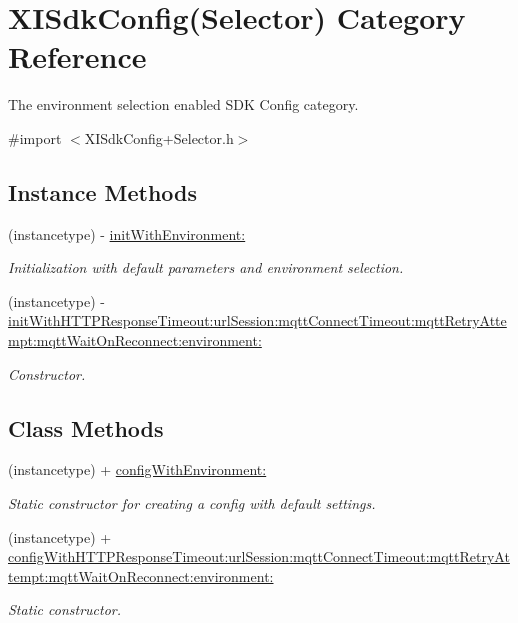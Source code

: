 \hypertarget{category_x_i_sdk_config_07_selector_08}{}\section{X\+I\+Sdk\+Config(Selector) Category Reference}
\label{category_x_i_sdk_config_07_selector_08}


The environment selection enabled S\+DK Config category.  




{\ttfamily \#import $<$X\+I\+Sdk\+Config+\+Selector.\+h$>$}

\subsection*{Instance Methods}
\begin{DoxyCompactItemize}
\item 
(instancetype) -\/ \hyperlink{category_x_i_sdk_config_07_selector_08_aaf78fa6769fee2f17ba641609f112e55}{init\+With\+Environment\+:}
\begin{DoxyCompactList}\small\item\em Initialization with default parameters and environment selection. \end{DoxyCompactList}\item 
(instancetype) -\/ \hyperlink{category_x_i_sdk_config_07_selector_08_aeceeeb80a520f874d9793485a70bd591}{init\+With\+H\+T\+T\+P\+Response\+Timeout\+:url\+Session\+:mqtt\+Connect\+Timeout\+:mqtt\+Retry\+Attempt\+:mqtt\+Wait\+On\+Reconnect\+:environment\+:}
\begin{DoxyCompactList}\small\item\em Constructor. \end{DoxyCompactList}\end{DoxyCompactItemize}
\subsection*{Class Methods}
\begin{DoxyCompactItemize}
\item 
(instancetype) + \hyperlink{category_x_i_sdk_config_07_selector_08_afa1234314350e4363b3540809540812b}{config\+With\+Environment\+:}
\begin{DoxyCompactList}\small\item\em Static constructor for creating a config with default settings. \end{DoxyCompactList}\item 
(instancetype) + \hyperlink{category_x_i_sdk_config_07_selector_08_a01ace5ad13ef869398e87b9413dab6e3}{config\+With\+H\+T\+T\+P\+Response\+Timeout\+:url\+Session\+:mqtt\+Connect\+Timeout\+:mqtt\+Retry\+Attempt\+:mqtt\+Wait\+On\+Reconnect\+:environment\+:}
\begin{DoxyCompactList}\small\item\em Static constructor. \end{DoxyCompactList}\end{DoxyCompactItemize}
